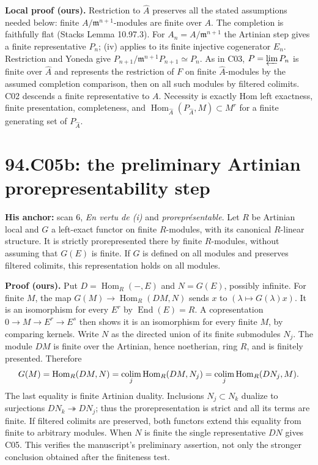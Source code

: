 \documentclass[11pt]{article}
\newcommand{\Hom}{\operatorname{Hom}}
\newcommand{\End}{\operatorname{End}}
\newcommand{\colim}{\mathop{\rm colim}}
\newcommand{\m}{\mathfrak m}
\begin{document}
\textbf{Local proof (ours).}
Restriction to $\widehat A$ preserves all the stated assumptions
needed below: finite $A/\m^{n+1}$-modules are finite over $A$.
The completion is faithfully flat (Stacks Lemma 10.97.3).
For $A_n=A/\m^{n+1}$ the Artinian step gives a finite representative
$P_n$; (iv) applies to its finite injective cogenerator $E_n$.
Restriction and Yoneda give
$P_{n+1}/\m^{n+1}P_{n+1}\simeq P_n$.
As in C03, $P=\varprojlim P_n$ is finite over $\widehat A$ and represents
the restriction of $F$ on finite $\widehat A$-modules by the assumed
completion comparison, then on all such modules by filtered colimits.
C02 descends a finite representative to $A$. Necessity is exactly
Hom left exactness, finite presentation, completeness, and
$\Hom_{\widehat A}(P_{\widehat A},M)\subset M^r$ for a finite generating
set of $P_{\widehat A}$.

\section{94.C05b: the preliminary Artinian prorepresentability step}
\label{C05b}
\textbf{His anchor:} scan 6, \emph{En vertu de (i)} and
\emph{prorepr\'esentable}. Let $R$ be Artinian local and $G$ a
left-exact functor on finite $R$-modules, with its canonical
$R$-linear structure. It is strictly prorepresented there by finite
$R$-modules, without assuming that $G(E)$ is finite. If $G$ is defined
on all modules and preserves filtered colimits, this representation
holds on all modules.

\textbf{Proof (ours).} Put $D=\Hom_R(-,E)$ and $N=G(E)$, possibly
infinite. For finite $M$, the map
$G(M)\to\Hom_R(DM,N)$ sends $x$ to
$(\lambda\mapsto G(\lambda)x)$. It is an isomorphism for every
$E^r$ by $\End(E)=R$. A copresentation $0\to M\to E^r\to E^s$
then shows it is an isomorphism for every finite $M$, by comparing
kernels. Write $N$ as the directed union of its finite submodules
$N_j$. The module $DM$ is finite over the Artinian, hence noetherian,
ring $R$, and is finitely presented. Therefore
\[
 G(M)=\Hom_R(DM,N)=\colim_j\Hom_R(DM,N_j)
       =\colim_j\Hom_R(DN_j,M).
\]
The last equality is finite Artinian duality. Inclusions $N_j\subset
N_k$ dualize to surjections $DN_k\twoheadrightarrow DN_j$; thus the
prorepresentation is strict and all its terms are finite. If filtered
colimits are preserved, both functors extend this equality from finite
to arbitrary modules. When $N$ is finite the single representative
$DN$ gives C05. This verifies the manuscript's preliminary assertion,
not only the stronger conclusion obtained after the finiteness test.
\end{document}
